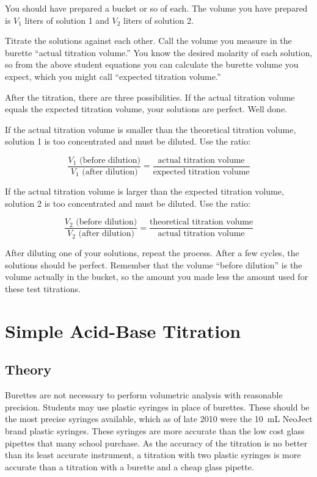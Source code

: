 You should have prepared a bucket or so of each. The volume you have prepared is $ V_{1} $ liters of solution 1 and $ V_{2} $ liters of solution 2.

Titrate the solutions against each other. Call the volume you measure in the burette ``actual titration volume.''  You know the desired molarity of each solution, so from the above student equations you can calculate the burette volume you expect, which you might call ``expected titration volume.''

After the titration, there are three possibilities. If the actual titration volume equals the expected titration volume, your solutions are perfect. Well done.

If the actual titration volume is smaller than the theoretical titration volume, solution 1 is too concentrated and must be diluted. Use the ratio:

\[ \frac{V_{1} \mbox{ (before dilution)}}{V_{1} \mbox{ (after dilution)}} = \frac{\mbox{actual titration volume}}{\mbox{expected titration volume}} \]

If the actual titration volume is larger than the expected titration volume, solution 2 is too concentrated and must be diluted. Use the ratio:

\[ \frac{V_{2} \mbox{ (before dilution)}}{V_{2} \mbox{ (after dilution)}} = \frac{\mbox{theoretical titration volume}}{\mbox{actual titration volume}} \]

After diluting one of your solutions, repeat the process. After a few cycles, the solutions should be perfect. Remember that the volume ``before dilution'' is the volume actually in the bucket, so the amount you made less the amount used for these test titrations.

\section{Simple Acid-Base Titration}

\subsection{Theory}

Burettes are not necessary to perform volumetric analysis with reasonable precision. Students may use plastic syringes in place of burettes. These should be the most precise syringes available, which as of late 2010 were the 10~mL NeoJect brand plastic syringes. These syringes are more accurate than the low cost glass pipettes that many school purchase. As the accuracy of the titration is no better than its least accurate instrument, a titration with two plastic syringes is more accurate than a titration with a burette and a cheap glass pipette.

